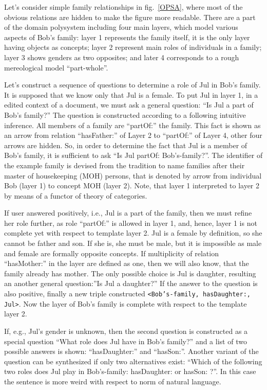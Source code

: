 \documentclass[conference]{IEEEtran}
\begin{document}
Let's consider simple family relationships in fig.~\ref{OPSA}, where
most of the obvious relations are hidden to make the figure more
readable.  There are a part of the domain polysystem including four
main layers, which model various aspects of Bob's family: layer 1
represents the family itself, it is the only layer having objects as
concepts; layer 2 represent main roles of individuals in a family;
layer 3 shows genders as two opposites; and later 4 corresponds to
a rough mereological model ``part-whole''.

Let's construct a sequence of questions to determine a role of Jul in
Bob's family.  It is supposed that we know only that Jul is a female.
To put Jul in layer 1, in a edited context of a document, we must ask
a general question: ``Is Jul a part of Bob's family?''  The question
is constructed according to a following intuitive inference.  All
members of a family are ``partOf:'' the family.  This fact is shown as
an arrow from relation ``hasFather:'' of Layer 2 to ``partOf:'' of Layer
4, other four arrows are hidden.  So, in order to determine the fact
that Jul is a member of Bob's family, it is sufficient to ask ``Is Jul
partOf: Bob's-family?''.  The identifier of the example family is
devised from the tradition to name families after their master of
housekeeping (MOH) persons, that is denoted by arrow from individual
Bob (layer 1) to concept MOH (layer 2).  Note, that layer 1
interpreted to layer 2 by means of a functor of theory of categories.

If user answered positively, i.e., Jul is a part of the family, then
we must refine her role further, as role ``partOf:'' is allowed in
layer 1, and, hence, layer 1 is not complete yet with respect to
template layer 2.  Jul is a female by definition, so she cannot be
father and son.  If she is, she must be male, but it is impossible as
male and female are formally opposite concepts.  If multiplicity of
relation ``hasMother:'' in the layer are defined as one, then we will
also know, that the family already has mother.  The only possible
choice is Jul is daughter, resulting an another general question:''Is
Jul a daughter?''  If the answer to the question is also positive,
finally a new triple constructed \texttt{<Bob's-family, hasDaughter:,
  Jul>}.  Now the layer of Bob's family is complete with respect to
the template layer 2.

If, e.g., Jul's gender is unknown, then the second question is
constructed as a special question ``What role does Jul have in Bob's
family?'' and a list of two possible answers is shown:
``hasDaughter:'' and ``hasSon:''.  Another variant of the question can
be synthesized if only two alternatives exist: ``Which of the
following two roles does Jul play in Bob's-family: hasDaughter: or
hasSon: ?''.  In this case the sentence is more weird with respect to
norm of natural language.
\end{document}
